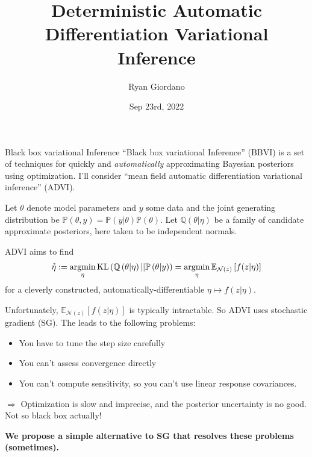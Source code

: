 \documentclass[8pt]{beamer}\usepackage[]{graphicx}\usepackage[]{color}
\title{Deterministic Automatic Differentiation Variational Inference}
\author{Ryan Giordano}
\date{Sep 23rd, 2022}
\institute{Massachusetts Institute of Technology}
\def\p#1{\mathbb{P}\left(#1\right)}
\def\q#1{\mathbb{Q}\left(#1\right)}
\def\y{y}
\def\z{z}
\def\normz{\mathcal{N}(z)}
\newcommand{\etastar}{\accentset{*}{\eta}}
\def\expect#1#2{\mathbb{E}_{#1}\left[#2\right]}
\def\kl#1{\mathrm{KL}\left(#1\right)}
\DeclareMathOperator*{\argmin}{\mathrm{argmin}}
\begin{document}

\begin{frame}{Black box variational Inference}
%
``Black box variational Inference'' (BBVI) is a set of techniques for quickly and
{\em automatically} approximating Bayesian posteriors using optimization. I'll
consider ``mean field automatic differentiation variational inference'' (ADVI).

\pause
Let $\theta$ denote model parameters and $\y$ some data and the joint
generating distribution be $\p{\theta, \y} = \p{\y \vert \theta} \p{\theta}$.
Let $\q{\theta \vert \eta}$ be a family of candidate approximate posteriors,
here taken to be independent normals.

ADVI aims to find
%
\begin{align*}
%
\etastar :=
    \argmin_{\eta} \kl{\q{\theta \vert \eta} || \p{\theta \vert \y}}
    = \argmin_{\eta} \expect{\normz}{f(\z  | \eta)}
%
\end{align*}
%
for a cleverly constructed, automatically-differentiable $\eta \mapsto f(\z |
\eta)$.

\pause
Unfortunately, $\expect{\normz}{f(\z  | \eta)}$ is typically intractable. So
ADVI uses stochastic gradient (SG).  The leads to the following problems:
%
\begin{itemize}
%
\item You have to tune the step size carefully
\item You can't assess convergence directly
\item You can't compute sensitivity, so you can't use linear response
covariances.
%
\end{itemize}
%
$\Rightarrow$ Optimization is slow and imprecise, and the posterior uncertainty
is no good.  Not so black box actually!

\textbf{
We propose a simple alternative to SG that resolves these
problems (sometimes).
}

%
\end{frame}



\end{document}
